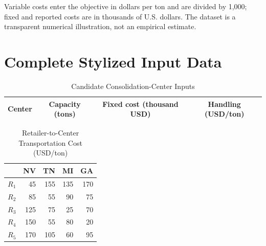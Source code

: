 Variable costs enter the objective in dollars per ton and are divided by 1,000;
fixed and reported costs are in thousands of U.S. dollars. The dataset is a
transparent numerical illustration, not an empirical estimate.

\section{Complete Stylized Input Data}

\begin{table}[htbp]
\centering
\caption{Candidate Consolidation-Center Inputs}
\label{tab:app_ch4_centers}
\begin{tabular}{lccc}
\toprule
Center & Capacity (tons) & Fixed cost (thousand USD) & Handling (USD/ton) \\
\midrule

\end{tabular}
\end{table}

\begin{table}[htbp]
\centering
\caption{Processor Inputs}
\label{tab:app_ch4_processors}
\end{table}

\begin{table}[htbp]
\centering
\caption{Retailer-to-Center Transportation Cost (USD/ton)}
\label{tab:app_ch4_retailer_transport}
\begin{tabular}{lrrrr}
\toprule
 & NV & TN & MI & GA \\
\midrule
$R_1$ & 45 & 155 & 135 & 170 \\
$R_2$ & 85 & 55 & 90 & 75 \\
$R_3$ & 125 & 75 & 25 & 70 \\
$R_4$ & 150 & 55 & 80 & 20 \\
$R_5$ & 170 & 105 & 60 & 95 \\
\bottomrule
\end{tabular}
\end{table}

